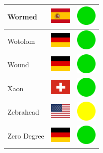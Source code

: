 \documentclass[12pt, a4paper, twoside]{report}
\begin{document}
\begin{center}
\begin{longtable}{|p{5cm}|p{2cm}|p{2cm}|}
 Wormed                                                     & \includegraphics[width=1cm]{../4x3/es} &   \includegraphics[width=1cm]{../likes/y} \\ \hline
 Wotolom                                                    & \includegraphics[width=1cm]{../4x3/de} &   \includegraphics[width=1cm]{../likes/y} \\ \hline
 Wound                                                      & \includegraphics[width=1cm]{../4x3/de} &   \includegraphics[width=1cm]{../likes/y} \\ \hline
 Xaon                                                       & \includegraphics[width=1cm]{../4x3/ch} &   \includegraphics[width=1cm]{../likes/y} \\ \hline
 Zebrahead                                                  & \includegraphics[width=1cm]{../4x3/us} &   \includegraphics[width=1cm]{../likes/m} \\ \hline
 Zero Degree                                                & \includegraphics[width=1cm]{../4x3/de} &   \includegraphics[width=1cm]{../likes/y} \\ \hline

\end{longtable}
\end{center}
\end{document}
